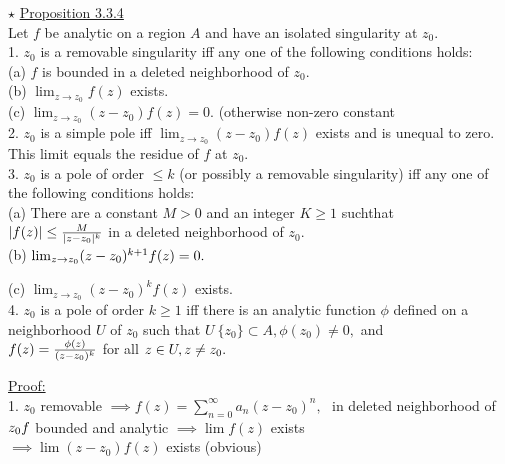 \documentclass[12pt]{amsart}
\begin{document}
\begin{enumerate}
$\star$
\underline{Proposition 3.3.4}\\
Let $f$ be analytic on a region $A$ and have an isolated singularity at $z_0$.\\
1. $z_0$ is a removable singularity iff any one of the following conditions holds:\\
(a) $f$ is bounded in a deleted neighborhood of $z_0$.\\
(b) $\lim_{z \rightarrow z_0} f(z)$ exists.\\
(c) $\lim_{z \rightarrow z_0}(z-z_0) f(z) = 0.$ (otherwise non-zero constant\\
2. $z_0$ is a simple pole iff $\lim_{z \rightarrow z_0} (z-z_0) f(z)$ exists and is unequal to zero. This limit equals the residue of $f$ at $z_0$.\\
3. $z_0$ is a pole of order $\leq k$ (or possibly a removable singularity) iff any one of the following conditions holds:\\
(a) There are a constant $M > 0$ and an integer $K \geq 1$ suchthat\\
$|f(z)| \leq \frac{M}{|z-z_0|^k}\\$
in a deleted neighborhood of $z_0$.\\
(b) $\lim_{z \rightarrow z_0} (z-z_0)^{k+1} f(z) = 0.\\$

(c) $\lim_{z \rightarrow z_0}(z-z_0)^k f(z)$ exists.\\
4. $z_0$ is a pole of order $k \geq 1$ iff there is an analytic function $\phi$ defined on a neighborhood $U$ of $z_0$ such that $U\ \{z_0 \} \subset A, \phi(z_0) \neq 0,$ and\\
$f(z) = \frac{\phi(z)}{(z-z_0)^k}\\$
for all $z \in U, z \neq z_0.\\$

\underline{Proof:}\\
1. $z_0$ removable $\implies f(z) = \sum_{n=0}^{\infty} a_n (z-z_0)^n,\,\,$ in deleted neighborhood of $z_0\\
f$ bounded and analytic $\implies \lim f(z)$ exists\\
$\implies \lim(z-z_0) f(z)$ exists (obvious)\\


\end{enumerate}
\end{document}
